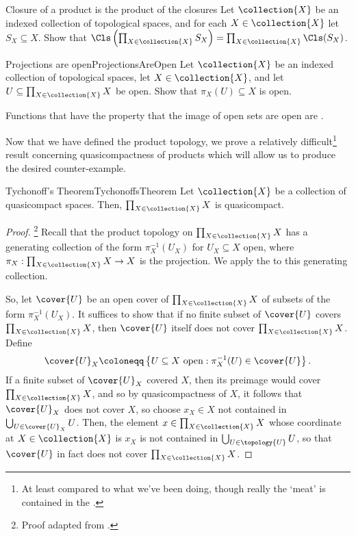 \begin{exr}{Closure of a product is the product of the closures}{}
Let $\collection{X}$ be an indexed collection of topological spaces, and for each $X\in \collection{X}$ let $S_X\subseteq X$.  Show that $\Cls \left( \prod _{X\in \collection{X}}S_X\right) =\prod _{X\in \collection{X}}\Cls (S_X)$.
\end{exr}
\begin{exr}{Projections are open}{ProjectionsAreOpen}
Let $\collection{X}$ be an indexed collection of topological spaces, let $X\in \collection{X}$, and let $U\subseteq \prod _{X\in \collection{X}}X$ be open.  Show that $\pi _X(U)\subseteq X$ is open.
\begin{rmk}
Functions that have the property that the image of open sets are open are .
\end{rmk}
\end{exr}

Now that we have defined the product topology, we prove a relatively difficult\footnote{At least compared to what we've been doing, though really the `meat' is contained in the .} result concerning quasicompactness of products which will allow us to produce the desired counter-example.
\begin{thm}{Tychonoff's Theorem}{TychonoffsTheorem}
Let $\collection{X}$ be a collection of quasicompact spaces.  Then, $\prod _{X\in \collection{X}}X$ is quasicompact.
\begin{proof}\footnote{Proof adapted from \cite[pg.~143]{Kelley}.}
Recall that the product topology on $\prod _{X\in \collection{X}}X$ has a generating collection of the form $\pi _X^{-1}(U_X)$ for $U_X\subseteq X$ open, where $\pi _X:\prod _{X\in \collection{X}}X\rightarrow X$ is the projection.  We apply the  to this generating collection.

So, let $\cover{U}$ be an open cover of $\prod _{X\in \collection{X}}X$ of subsets of the form $\pi _X^{-1}(U_X)$.  It suffices to show that if no finite subset of $\cover{U}$ covers $\prod _{X\in \collection{X}}X$, then $\cover{U}$ itself does not cover $\prod _{X\in \collection{X}}X$.  Define
\begin{equation}
\cover{U}_X\coloneqq \left\{ U\subseteq X\text{ open}:\pi _X^{-1}(U)\in \cover{U}\right\} .
\end{equation}
If a finite subset of $\cover {U}_X$ covered $X$, then its preimage would cover $\prod _{X\in \collection{X}}X$, and so by quasicompactness of $X$, it follows that $\cover{U}_X$ does not cover $X$, so choose $x_X\in X$ not contained in $\bigcup _{U\in \cover {U}_X}U$.  Then, the element $x\in \prod _{X\in \collection{X}}X$ whose coordinate at $X\in \collection{X}$ is $x_X$ is not contained in $\bigcup _{U\in \topology{U}}U$, so that $\cover{U}$ in fact does not cover $\prod _{X\in \collection{X}}X$.
\end{proof}
\end{thm}

